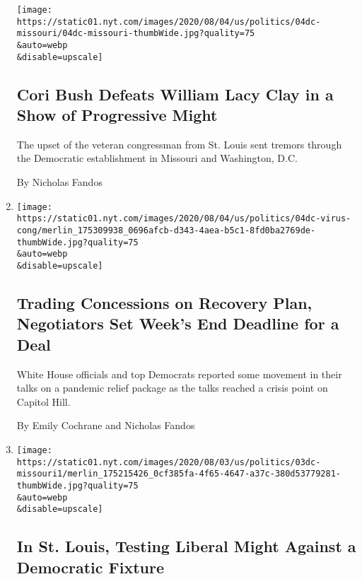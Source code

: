\begin{enumerate}
  \texttt{[image: https://static01.nyt.com/images/2020/08/04/us/politics/04dc-missouri/04dc-missouri-thumbWide.jpg?quality=75\\\&auto=webp\\\&disable=upscale]}

  \hypertarget{cori-bush-defeats-william-lacy-clay-in-a-show-of-progressive-might}{%
  \subsection{Cori Bush Defeats William Lacy Clay in a Show of
  Progressive
  Might}\label{cori-bush-defeats-william-lacy-clay-in-a-show-of-progressive-might}}

  The upset of the veteran congressman from St. Louis sent tremors
  through the Democratic establishment in Missouri and Washington, D.C.

  By Nicholas Fandos
\item
  \href{/2020/08/04/us/politics/coronavirus-recovery-plan-negotiations.html}{}

  \texttt{[image: https://static01.nyt.com/images/2020/08/04/us/politics/04dc-virus-cong/merlin\_175309938\_0696afcb-d343-4aea-b5c1-8fd0ba2769de-thumbWide.jpg?quality=75\\\&auto=webp\\\&disable=upscale]}

  \hypertarget{trading-concessions-on-recovery-plan-negotiators-set-weeks-end-deadline-for-a-deal}{%
  \subsection{Trading Concessions on Recovery Plan, Negotiators Set
  Week's End Deadline for a
  Deal}\label{trading-concessions-on-recovery-plan-negotiators-set-weeks-end-deadline-for-a-deal}}

  White House officials and top Democrats reported some movement in
  their talks on a pandemic relief package as the talks reached a crisis
  point on Capitol Hill.

  By Emily Cochrane and Nicholas Fandos
\item
  \href{/2020/08/02/us/politics/cori-bush-william-lacy-clay-missouri.html}{}

  \texttt{[image: https://static01.nyt.com/images/2020/08/03/us/politics/03dc-missouri1/merlin\_175215426\_0cf385fa-4f65-4647-a37c-380d53779281-thumbWide.jpg?quality=75\\\&auto=webp\\\&disable=upscale]}

  \hypertarget{in-st-louis-testing-liberal-might-against-a-democratic-fixture}{%
  \subsection{In St. Louis, Testing Liberal Might Against a Democratic
  Fixture}\label{in-st-louis-testing-liberal-might-against-a-democratic-fixture}}


\end{enumerate}

